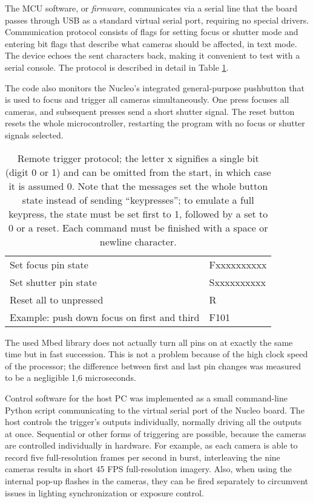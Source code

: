 The MCU software, or \emph{firmware}, communicates via a serial line that the board passes through USB as a standard virtual serial port, requiring no special drivers.
Communication protocol consists of flags for setting focus or shutter mode and entering bit flags that describe what cameras should be affected, in text mode.
The device echoes the sent characters back, making it convenient to test with a serial console.
The protocol is described in detail in Table \ref{tab:triggerprotocol}.

The code also monitors the Nucleo's integrated general-purpose pushbutton that is used to focus and trigger all cameras simultaneously.
One press focuses all cameras, and subsequent presses send a short shutter signal.
The reset button resets the whole microcontroller, restarting the program with no focus or shutter signals selected.

\begin{table}[h]
	\centering
	\begin{tabular}{l l}
		Set focus pin state & Fxxxxxxxxxx\\
		Set shutter pin state & Sxxxxxxxxxx\\
		Reset all to unpressed & R\\
		Example: push down focus on first and third & F101\\
	\end{tabular}
	\caption{
		Remote trigger protocol; the letter x signifies a single bit (digit 0 or 1) and can be omitted from the start, in which case it is assumed 0.
		Note that the messages set the whole button state instead of sending ``keypresses'';
		to emulate a full keypress, the state must be set first to 1, followed by a set to 0 or a reset.
		Each command must be finished with a space or newline character.
	}
	\label{tab:triggerprotocol}
\end{table}

The used Mbed library does not actually turn all pins on at exactly the same time but in fast succession.
This is not a problem because of the high clock speed of the processor;
the difference between first and last pin changes was measured to be a negligible 1,6 microseconds.

Control software for the host PC was implemented as a small command-line Python script communicating to the virtual serial port of the Nucleo board.
The host controls the trigger's outputs individually, normally driving all the outputs at once.
Sequential or other forms of triggering are possible, because the cameras are controlled individually in hardware.
For example, as each camera is able to record five full-resolution frames per second in burst, interleaving the nine cameras results in short 45 FPS full-resolution imagery.
Also, when using the internal pop-up flashes in the cameras, they can be fired separately to circumvent issues in lighting synchronization or exposure control.

